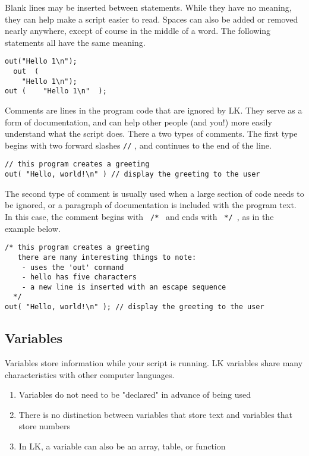 \documentclass{article}
\begin{document}
Blank lines may be inserted between statements.  While they have no meaning, they can help make a script easier to read.  Spaces can also be added or removed nearly anywhere, except of course in the middle of a word.  The following statements all have the same meaning.

\begin{verbatim}
out("Hello 1\n");
  out  (
    "Hello 1\n");
out (    "Hello 1\n"  );
\end{verbatim}

Comments are lines in the program code that are ignored by LK.  They serve as a form of documentation, and can help other people (and you!) more easily understand what the script does.  There a two types of comments.  The first type begins with two forward slashes \texttt{//} , and continues to the end of the line.

\begin{verbatim}
// this program creates a greeting
out( "Hello, world!\n" ) // display the greeting to the user
\end{verbatim}

The second type of comment is usually used when a large section of code needs to be ignored, or a paragraph of documentation is included with the program text.  In this case, the comment begins with \texttt{ /* } and ends with \texttt{ */ }, as in the example below.

\begin{verbatim}
/* this program creates a greeting
   there are many interesting things to note:
    - uses the 'out' command
    - hello has five characters
    - a new line is inserted with an escape sequence
  */
out( "Hello, world!\n" ); // display the greeting to the user
\end{verbatim}

\subsection{Variables}

Variables store information while your script is running.  LK variables share many characteristics with other computer languages.
\begin{enumerate}
\item Variables do not need to be "declared" in advance of being used
\item There is no distinction between variables that store text and variables that store numbers
\item In LK, a variable can also be an array, table, or function
\end{enumerate}
\end{document}
